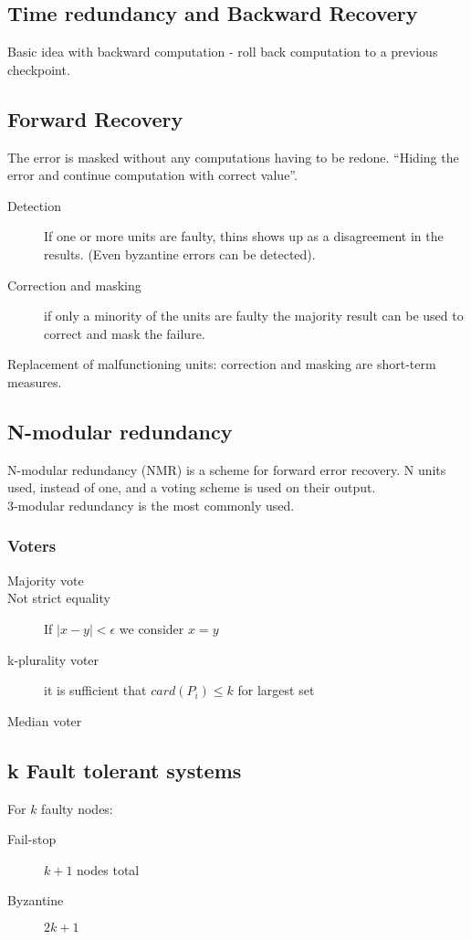 \documentclass[a4paper]{article}
\begin{document}
\subsection{Time redundancy and Backward Recovery}
Basic idea with backward computation - roll back computation to a previous
checkpoint.\\
\subsection{Forward Recovery}
The error is masked without any computations having to be redone. ``Hiding the
error and continue computation with correct value''.
\begin{description}
		\item[Detection] If one or more units are faulty, thins shows up as a
				disagreement in the results. (Even byzantine errors can be
				detected).
		\item[Correction and masking] if only a minority of the units are faulty
				the majority result can be used to correct and mask the failure.
\end{description}
Replacement of malfunctioning units: correction and masking are
short-term measures.
\subsection{N-modular redundancy}
N-modular redundancy (NMR) is a scheme for forward error recovery. N units used,
instead of one, and a voting scheme is used on their output.\\
3-modular redundancy is the most commonly used.
\subsubsection{Voters}
\begin{description}
		\item[Majority vote]
		\item[Not strict equality] If $|x-y|< \epsilon$ we consider $x=y$
		\item[k-plurality voter] it is sufficient that $card(P_i)\leq k$ for
				largest set
		\item[Median voter]
\end{description} 
\subsection{k Fault tolerant systems}
For $k$ faulty nodes:
\begin{description}
		\item[Fail-stop] $k+1$ nodes total
		\item[Byzantine] $2k+1$
\end{description}
\end{document}
